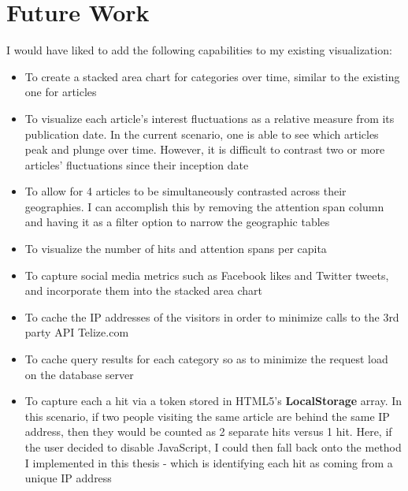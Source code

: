 \documentclass[12pt]{article}
\begin{document}
\section{Future Work}
I would have liked to add the following capabilities to my existing visualization:
\begin{itemize}
\item To create a stacked area chart for categories over time, similar to the existing one for articles
\item To visualize each article's interest fluctuations as a relative measure from its publication date. In the current scenario, one is able to see which articles peak and plunge over time. However, it is difficult to contrast two or more articles' fluctuations since their inception date
\item To allow for 4 articles to be simultaneously contrasted across their geographies. I can accomplish this by removing the attention span column and having it as a filter option to narrow the geographic tables
\item To visualize the number of hits and attention spans per capita
\item To capture social media metrics such as Facebook likes and  Twitter tweets, and incorporate them into the stacked area chart 
\item To cache the IP addresses of the visitors in order to minimize calls to the 3rd party API Telize.com
\item To cache query results for each category so as to minimize the request load on the database server
\item To capture each a hit via a token stored in HTML5's \textbf{LocalStorage} array. In this scenario, if two people visiting the same article are behind the same IP address, then they would be counted as 2 separate hits versus 1 hit. Here, if the user decided to disable JavaScript, I could then fall back onto the method I implemented in this thesis - which is identifying each hit as coming from a unique IP address
\end{itemize}
\newpage
\end{document}
